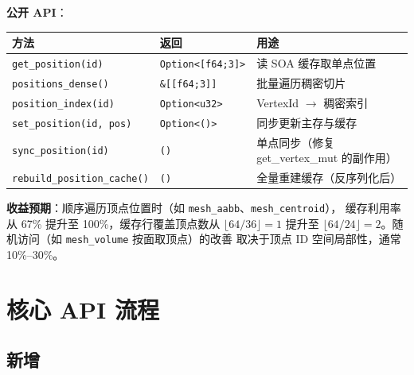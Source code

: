 \documentclass[11pt,a4paper]{article}
\begin{document}
\textbf{公开 API}：
\begin{center}
\renewcommand{\arraystretch}{1.15}
\begin{tabular}{@{}lll@{}}
  \toprule
  \textbf{方法} & \textbf{返回} & \textbf{用途} \\
  \midrule
  \texttt{get\_position(id)}        & \texttt{Option<[f64;3]>} & 读 SOA 缓存取单点位置 \\
  \texttt{positions\_dense()}        & \texttt{\&[[f64;3]]}    & 批量遍历稠密切片 \\
  \texttt{position\_index(id)}        & \texttt{Option<u32>}    & VertexId $\to$ 稠密索引 \\
  \texttt{set\_position(id, pos)}    & \texttt{Option<()>}     & 同步更新主存与缓存 \\
  \texttt{sync\_position(id)}        & \texttt{()}             & 单点同步（修复 get\_vertex\_mut 的副作用） \\
  \texttt{rebuild\_position\_cache()} & \texttt{()}             & 全量重建缓存（反序列化后） \\
  \bottomrule
\end{tabular}
\end{center}

\textbf{收益预期}：顺序遍历顶点位置时（如 \texttt{mesh\_aabb}、\texttt{mesh\_centroid}），
缓存利用率从 67\% 提升至 100\%，缓存行覆盖顶点数从 $\lfloor 64/36 \rfloor = 1$ 提升至
$\lfloor 64/24 \rfloor = 2$。随机访问（如 \texttt{mesh\_volume} 按面取顶点）的改善
取决于顶点 ID 空间局部性，通常 10\%--30\%。

\section{核心 API 流程}

\subsection{新增}

\begin{center}
\end{center}
\end{document}
